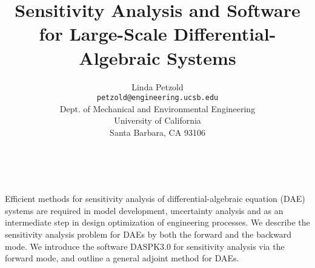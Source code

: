\documentclass[11pt]{article}
\date{ ~ \hspace{-4mm}}
\title{Sensitivity Analysis and Software for Large-Scale Differential-Algebraic Systems  }
\author{Linda Petzold \\ {\tt  petzold@engineering.ucsb.edu} \\ Dept. of Mechanical and Environmental Engineering \\ University of California \\ Santa Barbara, CA  93106}
\begin{document}
\maketitle
\thispagestyle{empty}


 



Efficient methods for sensitivity analysis of differential-algebraic
equation (DAE) systems are required in model development, uncertainty
analysis and as an intermediate step in design optimization of
engineering processes.  We describe the sensitivity analysis problem
for DAEs by both the forward and the backward mode.  We introduce the
software DASPK3.0 for sensitivity analysis via the forward mode, and
outline a general adjoint method for DAEs.
\end{document}
